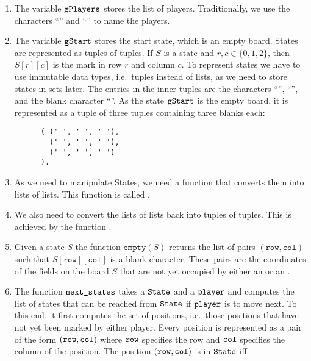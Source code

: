 \begin{enumerate}
\item The variable $\texttt{gPlayers}$ stores the list of players.  Traditionally, we use the characters
      ``'' and ``'' to name the players.   
\item The variable $\texttt{gStart}$ stores the start state, which is an empty board.
      States are represented as tuples of tuples.  If $S$ is a state and $r,c \in \{0,1,2\}$,
      then $S[r][c]$ is the mark in row $r$ and column $c$.
      To represent states we have to use immutable data types, i.e.~tuples instead of lists, as we need to
      store states in sets later.  The entries in the inner tuples are the characters 
      ``'', ``'', and the blank character ``\textts{ }''.
      As the state  $\texttt{gStart}$ is the empty board, it is represented as a tuple of three tuples
      containing three blanks each:
      \begin{Verbatim}
      ( (' ', ' ', ' '), 
        (' ', ' ', ' '), 
        (' ', ' ', ' ')
      ).     
      \end{Verbatim}
\item As we need to manipulate States, we need a function that converts them into lists of lists.
      This function is called .
\item We also need to convert the lists of lists back into tuples of tuples.  This is achieved by the function
      .
\item Given a state $S$ the function $\mathtt{empty}(S)$ returns the list of pairs 
      $(\mathtt{row}, \mathtt{col})$ such that $S[\mathtt{row}][\mathtt{col}]$ is a blank character.  These pairs are
      the coordinates of the fields on the board $S$ that are not yet occupied by either an  or an
      .   
\item The function $\texttt{next\_states}$ takes a $\texttt{State}$ and a $\texttt{player}$ and computes the list
      of states that can be reached from $\texttt{State}$ if $\texttt{player}$ is to move next.
      To this end, it first computes the set of  positions, i.e.~those positions that have not yet
      been marked by either player. Every position is represented as a pair of the
      form $(\texttt{row}, \texttt{col})$ where $\texttt{row}$ specifies the row and $\texttt{col}$ specifies
      the column of the position.  The position $(\texttt{row}, \texttt{col})$ is  in
      $\texttt{State}$ iff
      \\[0.2cm]

\end{enumerate}
